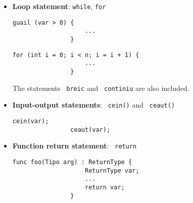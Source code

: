\documentclass[10pt,a4paper]{article}
\begin{document}
\begin{itemize}
    \item \textbf{Loop statement}: \texttt{while}, \texttt{for}
    \begin{center}
        \begin{minipage}{\linewidth}
            \begin{lstlisting}[linewidth=0.3\linewidth, gobble=16]
                guail (var > 0) {
                    ...
                }
            \end{lstlisting}
        \end{minipage}
    \end{center}
    \begin{center}
        \begin{minipage}{\linewidth}
            \begin{lstlisting}[linewidth=0.5\linewidth, gobble=16]
                for (int i = 0; i < n; i = i + 1) {
                    ...
                }
            \end{lstlisting}
        \end{minipage}
    \end{center}
    The statements \texttt{\color{blue} breic} and \texttt{\color{blue} continiu} are also included.

    \item \textbf{Input-output statements}: \texttt{\color{blue} cein()} and \texttt{\color{blue} ceaut()}
    \begin{center}
        \begin{minipage}{\linewidth}
            \begin{lstlisting}[linewidth=0.3\linewidth, gobble=16]
                cein(var);
                ceaut(var);
            \end{lstlisting}
        \end{minipage}
    \end{center}
    
    \item \textbf{Function return statement}: \texttt{\color{blue} return}
    \begin{center}
        \begin{minipage}{\linewidth}
            \begin{lstlisting}[linewidth=0.5\linewidth, gobble=16]
                func foo(Tipo arg) : ReturnType {
                    ReturnType var;
                    ...
                    return var;
                }
            \end{lstlisting}
        \end{minipage}
    \end{center}

\end{itemize}
\end{document}
